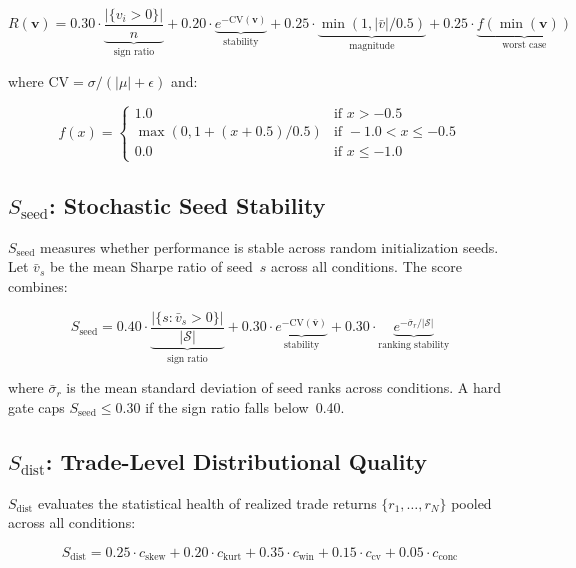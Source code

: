 \documentclass[12pt,a4paper]{article}
\begin{document}
\begin{equation}
  R(\mathbf{v}) = 0.30 \cdot \underbrace{\frac{|\{v_i > 0\}|}{n}}_{\text{sign ratio}}
  + 0.20 \cdot \underbrace{e^{-\text{CV}(\mathbf{v})}}_{\text{stability}}
  + 0.25 \cdot \underbrace{\min(1, |\bar{v}|/0.5)}_{\text{magnitude}}
  + 0.25 \cdot \underbrace{f(\min(\mathbf{v}))}_{\text{worst case}}
\end{equation}

where $\text{CV} = \sigma / (|\mu| + \epsilon)$ and:

\begin{equation}
  f(x) = \begin{cases}
    1.0 & \text{if } x > -0.5 \\
    \max(0, 1 + (x+0.5)/0.5) & \text{if } -1.0 < x \leq -0.5 \\
    0.0 & \text{if } x \leq -1.0
  \end{cases}
\end{equation}

\subsection*{$S_{\text{seed}}$: Stochastic Seed Stability}

$S_{\text{seed}}$ measures whether performance is stable across random initialization seeds. Let $\bar{v}_s$ be the mean Sharpe ratio of seed~$s$ across all conditions. The score combines:

\begin{equation}
  S_{\text{seed}} = 0.40 \cdot \underbrace{\frac{|\{s : \bar{v}_s > 0\}|}{|\mathcal{S}|}}_{\text{sign ratio}}
  + 0.30 \cdot \underbrace{e^{-\text{CV}(\mathbf{\bar{v}})}}_{\text{stability}}
  + 0.30 \cdot \underbrace{e^{-\bar{\sigma}_r / |\mathcal{S}|}}_{\text{ranking stability}}
\end{equation}

where $\bar{\sigma}_r$ is the mean standard deviation of seed ranks across conditions. A hard gate caps $S_{\text{seed}} \leq 0.30$ if the sign ratio falls below~0.40.

\subsection*{$S_{\text{dist}}$: Trade-Level Distributional Quality}

$S_{\text{dist}}$ evaluates the statistical health of realized trade returns $\{r_1, \ldots, r_N\}$ pooled across all conditions:

\begin{equation}
  S_{\text{dist}} = 0.25 \cdot c_{\text{skew}} + 0.20 \cdot c_{\text{kurt}} + 0.35 \cdot c_{\text{win}} + 0.15 \cdot c_{\text{cv}} + 0.05 \cdot c_{\text{conc}}
\end{equation}
\end{document}
